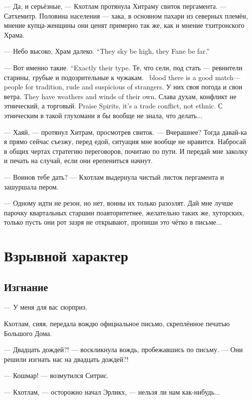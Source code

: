 --- Да, и серьёзные, --- Кхотлам протянула Хитраму свиток пергамента.
--- Сатхемитр.
Половина населения --- хака, в основном пахари из северных племён, мнение купца-женщины они ценят примерно так же, как и мнение тхитронского Храма.

{--- Небо высоко, Храм далеко.}
{``They sky be high, they Fane be far.''}

{--- Вот именно такие.}
{``Exactly their type.}
{Те, что сели, под стать --- ревнители старины, грубые и подозрительные к чужакам.}
{\Seli\ blood there is a good match---people for tradition, rude and suspicious of strangers.}
{У них своя погода и свои ветра.}
{They have weathers and winds of their own.}
{Слава духам, конфликт не этнический, а торговый.}
{Praise Spirits, it's a trade conflict, not ethnic.}
С этническим в такой глухомани я бы вообще не знала, что делать...

--- Хаяй, --- протянул Хитрам, просмотрев свиток.
--- Вчерашнее?
Тогда давай-ка я прямо сейчас съезжу, перед едой, ситуация мне вообще не нравится.
Набросай в общих чертах стратегию переговоров, почитаю по пути.
И передай мне заколку и печать на случай, если они ерепениться начнут.

--- Воинов тебе дать? --- Кхотлам выдернула чистый листок пергамента и зашуршала пером.

--- Одному идти не резон, но нет, воины их только разозлят.
Дай мне лучше парочку квартальных старшин поавторитетнее, желательно таких же, хуторских, только пусть они рот зазря не открывают, пропиши это чётко в письме...

\chapter{Взрывной характер}

\section{Изгнание}

--- У меня для вас сюрприз.

Кхотлам, сияя, передала вождю официальное письмо, скреплённое печатью Большого Дома.

--- Двадцать дождей?! --- воскликнула вождь, пробежавшись по письму.
--- Они решили изгнать нас на двадцать дождей?!

--- Кошмар! --- возмутился Ситрис.

--- Кхотлам, --- осторожно начал Эрликх, --- нельзя ли нам как-нибудь...

